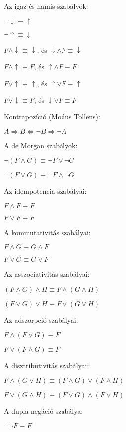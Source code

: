 \documentclass[10pt]{article}
\renewcommand{\\}{\par\noindent}
\begin{document}
\begin{frame}

\begin{tcolorbox}[title={Ekvivalens formulák}]
Az igaz és hamis szabályok:\\
${\neg}\downarrow \equiv \uparrow$\\
${\neg}\uparrow \equiv \downarrow$\\
$F \land \downarrow \equiv \downarrow$, és $\downarrow \land F \equiv \downarrow$\\
$F \land \uparrow \equiv F$, és $\uparrow \land F \equiv F$\\
$F \lor \uparrow \equiv \uparrow$, és $\uparrow \lor F \equiv \uparrow$\\
$F \lor \downarrow \equiv F$, és $\downarrow \lor F \equiv F$\\
\smallskip
Kontrapozíció (Modus Tollens):\\
$A \Rightarrow B \iff {\neg}B \Rightarrow {\neg}A$\\
\smallskip
A de Morgan szabályok:\\
${\neg}(F \land G) \equiv {\neg}F \lor {\neg}G$\\
${\neg}(F \lor G) \equiv {\neg}F \land {\neg}G$\\
\smallskip
Az idempotencia szabályai:\\
$F \land F \equiv F$\\
$F \lor F \equiv F$\\
\smallskip
A kommutativitás szabályai:\\
$F \land G \equiv G \land F$\\
$F \lor G \equiv G \lor F$\\
\smallskip
Az asszociativitás szabályai:\\
$(F \land G) \land H \equiv F \land (G \land H)$\\
$(F \lor G) \lor H \equiv F \lor (G \lor H)$\\
\smallskip
Az adszorpció szabályai:\\
$F \land (F \lor G) \equiv F$\\
$F \lor (F \land G) \equiv F$\\
\smallskip
A disztributivitás szabályai:\\
$F \land (G \lor H) \equiv (F \land G) \lor (F \land H)$\\
$F \lor (G \land H) \equiv (F \lor G) \land (F \lor H)$\\
\smallskip
A dupla negáció szabálya:\\
${\neg}{\neg}F \equiv F$
\end{tcolorbox}

\end{frame}
\end{document}
